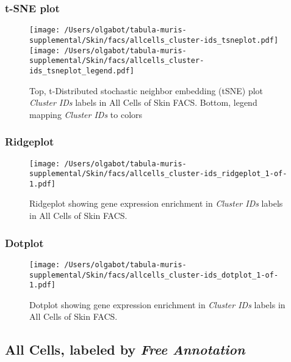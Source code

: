 \clearpage
\subsubsection{t-SNE plot}
\begin{figure}[h]
\centering
\texttt{[image: /Users/olgabot/tabula-muris-supplemental/Skin/facs/allcells\_cluster-ids\_tsneplot.pdf]}
\texttt{[image: /Users/olgabot/tabula-muris-supplemental/Skin/facs/allcells\_cluster-ids\_tsneplot\_legend.pdf]}
\caption{Top, t-Distributed stochastic neighbor embedding (tSNE) plot  \emph{Cluster IDs} labels in All Cells of Skin FACS. Bottom, legend mapping \emph{Cluster IDs} to colors}
\end{figure}


\clearpage

\subsubsection{Ridgeplot}
\begin{figure}[h]
\centering
\texttt{[image: /Users/olgabot/tabula-muris-supplemental/Skin/facs/allcells\_cluster-ids\_ridgeplot\_1-of-1.pdf]}

\caption{ Ridgeplot  showing gene expression enrichment in \emph{Cluster IDs} labels in All Cells of Skin FACS. }
\end{figure}


\clearpage

\subsubsection{Dotplot}
\begin{figure}[h]
\centering
\texttt{[image: /Users/olgabot/tabula-muris-supplemental/Skin/facs/allcells\_cluster-ids\_dotplot\_1-of-1.pdf]}

\caption{ Dotplot  showing gene expression enrichment in \emph{Cluster IDs} labels in All Cells of Skin FACS. }
\end{figure}


\clearpage

\subsection{All Cells, labeled by \emph{Free Annotation}}
